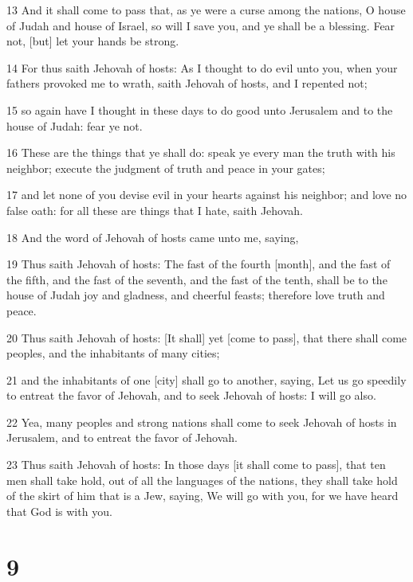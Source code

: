 \par 13 And it shall come to pass that, as ye were a curse among the nations, O house of Judah and house of Israel, so will I save you, and ye shall be a blessing. Fear not, [but] let your hands be strong.
\par 14 For thus saith Jehovah of hosts: As I thought to do evil unto you, when your fathers provoked me to wrath, saith Jehovah of hosts, and I repented not;
\par 15 so again have I thought in these days to do good unto Jerusalem and to the house of Judah: fear ye not.
\par 16 These are the things that ye shall do: speak ye every man the truth with his neighbor; execute the judgment of truth and peace in your gates;
\par 17 and let none of you devise evil in your hearts against his neighbor; and love no false oath: for all these are things that I hate, saith Jehovah.
\par 18 And the word of Jehovah of hosts came unto me, saying,
\par 19 Thus saith Jehovah of hosts: The fast of the fourth [month], and the fast of the fifth, and the fast of the seventh, and the fast of the tenth, shall be to the house of Judah joy and gladness, and cheerful feasts; therefore love truth and peace.
\par 20 Thus saith Jehovah of hosts: [It shall] yet [come to pass], that there shall come peoples, and the inhabitants of many cities;
\par 21 and the inhabitants of one [city] shall go to another, saying, Let us go speedily to entreat the favor of Jehovah, and to seek Jehovah of hosts: I will go also.
\par 22 Yea, many peoples and strong nations shall come to seek Jehovah of hosts in Jerusalem, and to entreat the favor of Jehovah.
\par 23 Thus saith Jehovah of hosts: In those days [it shall come to pass], that ten men shall take hold, out of all the languages of the nations, they shall take hold of the skirt of him that is a Jew, saying, We will go with you, for we have heard that God is with you.

\chapter{9}

